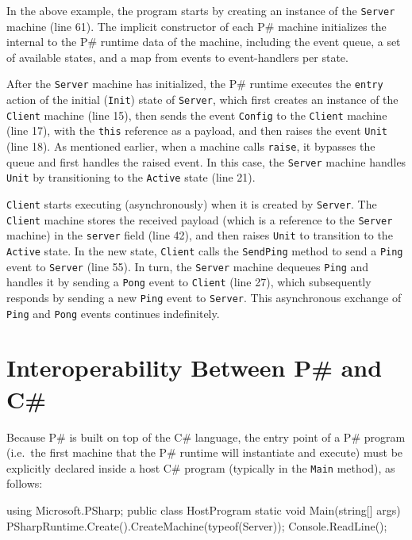 \documentclass{llncs}
\newcommand{\ps}{P\#\xspace}
\newcommand{\cs}{C\#\xspace}
\begin{document}
\noindent
In the above example, the program starts by creating an instance of the \texttt{Server} machine (line 61). The implicit constructor of each \ps machine initializes the internal to the \ps runtime data of the machine, including the event queue, a set of available states, and a map from events to event-handlers per state.

After the \texttt{Server} machine has initialized, the \ps runtime executes the
\texttt{entry} action of the initial (\texttt{Init}) state of \texttt{Server},
which first creates an instance of the \texttt{Client} machine (line 15), then
sends the event \texttt{Config} to the \texttt{Client} machine (line 17), with
the \texttt{this} reference as a payload, and then raises the event
\texttt{Unit} (line 18). As mentioned earlier, when a machine calls
\texttt{raise}, it bypasses the queue and first handles the raised event. In this case, the \texttt{Server} machine handles \texttt{Unit} by transitioning to the \texttt{Active} state (line 21).

\texttt{Client} starts executing (asynchronously) when it is created by \texttt{Server}. The \texttt{Client} machine stores the received payload (which is a reference to the \texttt{Server} machine) in the \texttt{server} field (line 42), and then raises \texttt{Unit} to transition to the \texttt{Active} state. In the new state, \texttt{Client} calls the \texttt{SendPing} method to send a \texttt{Ping} event to \texttt{Server} (line 55). In turn, the \texttt{Server} machine dequeues \texttt{Ping} and handles it by sending a \texttt{Pong} event to \texttt{Client} (line 27), which subsequently responds by sending a new \texttt{Ping} event to \texttt{Server}. This asynchronous exchange of \texttt{Ping} and \texttt{Pong} events continues indefinitely.

\section{Interoperability Between \ps and \cs}
\label{sec:interop}

Because \ps is built on top of the \cs language, the entry point of a \ps program (i.e.\ the first machine that the \ps runtime will instantiate and execute) must be explicitly declared inside a host \cs program (typically in the \texttt{Main} method), as follows:

\begin{psharpNoLines}
using Microsoft.PSharp;
public class HostProgram {
  static void Main(string[] args) {
    PSharpRuntime.Create().CreateMachine(typeof(Server));
    Console.ReadLine();
  }
}
\end{psharpNoLines}
\end{document}
